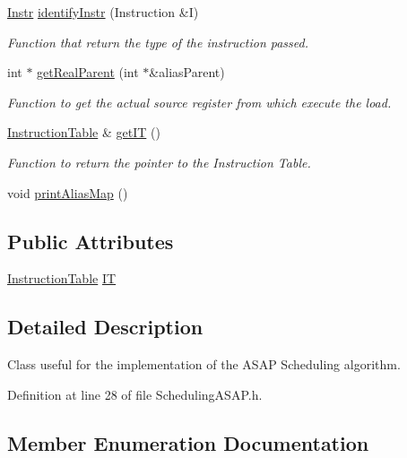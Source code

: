 \begin{DoxyCompactItemize}
\hyperlink{classoctantis_1_1SchedulingASAP_abbd454a56c823d34f835168cc31168f4}{Instr} \hyperlink{classoctantis_1_1SchedulingASAP_ac3f43eaa890ea2fe4457d0505b28da77}{identify\+Instr} (Instruction \&I)
\begin{DoxyCompactList}\small\item\em Function that return the type of the instruction passed. \end{DoxyCompactList}\item 
int $\ast$ \hyperlink{classoctantis_1_1SchedulingASAP_a310354a5c7a7613dd66c89b9c358528f}{get\+Real\+Parent} (int $\ast$\&alias\+Parent)
\begin{DoxyCompactList}\small\item\em Function to get the actual source register from which execute the load. \end{DoxyCompactList}\item 
\hyperlink{classoctantis_1_1InstructionTable}{Instruction\+Table} \& \hyperlink{classoctantis_1_1SchedulingASAP_a6c61709d8b29672b8e6cad471b81808d}{get\+IT} ()
\begin{DoxyCompactList}\small\item\em Function to return the pointer to the Instruction Table. \end{DoxyCompactList}\item 
void \hyperlink{classoctantis_1_1SchedulingASAP_ae3df036361ff37d74ca915487f1be0b4}{print\+Alias\+Map} ()
\end{DoxyCompactItemize}
\subsection*{Public Attributes}
\begin{DoxyCompactItemize}
\item 
\hyperlink{classoctantis_1_1InstructionTable}{Instruction\+Table} \hyperlink{classoctantis_1_1SchedulingASAP_ac53b361e1b4663c158238d93b931dce3}{IT}
\end{DoxyCompactItemize}


\subsection{Detailed Description}
Class useful for the implementation of the A\+S\+AP Scheduling algorithm. 

Definition at line 28 of file Scheduling\+A\+S\+A\+P.\+h.



\subsection{Member Enumeration Documentation}
\mbox{\label{classoctantis_1_1SchedulingASAP_abbd454a56c823d34f835168cc31168f4}} 
